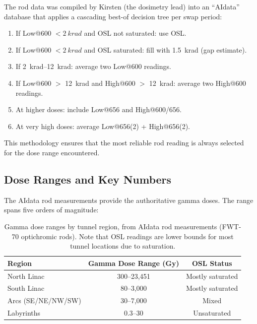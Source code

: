 \documentclass[11pt,letterpaper]{article}
\begin{document}
\begin{description}[style=nextline]
    The rod data was compiled by Kirsten (the dosimetry lead) into an ``AIdata''
    database that applies a cascading best-of decision tree per swap period:
    \begin{enumerate}
        \item If Low@600 $< \SI{2}{krad}$ and OSL not saturated: use OSL.
        \item If Low@600 $< \SI{2}{krad}$ and OSL saturated: fill with
        \SI{1.5}{krad} (gap estimate).
        \item If \SIrange{2}{12}{krad}: average two Low@600 readings.
        \item If Low@600 $>$ \SI{12}{krad} and High@600 $>$ \SI{12}{krad}:
        average two High@600 readings.
        \item At higher doses: include Low@656 and High@600/656.
        \item At very high doses: average Low@656(2) + High@656(2).
    \end{enumerate}
    This methodology ensures that the most reliable rod reading is always
    selected for the dose range encountered.

\end{description}

\subsection{Dose Ranges and Key Numbers}

The AIdata rod measurements provide the authoritative gamma doses. The range
spans five orders of magnitude:

\begin{table}[H]
\centering
\caption{Gamma dose ranges by tunnel region, from AIdata rod measurements
(FWT-70 optichromic rods). Note that OSL readings are lower bounds for most
tunnel locations due to saturation.}
\label{tab:dose_ranges}
\begin{tabular}{@{}lcc@{}}
\toprule
\textbf{Region} & \textbf{Gamma Dose Range (Gy)} & \textbf{OSL Status} \\
\midrule
North Linac    & 300--23,451 & Mostly saturated \\
South Linac    & 80--3,000   & Mostly saturated \\
Arcs (SE/NE/NW/SW) & 30--7,000 & Mixed \\
Labyrinths     & 0.3--30     & Unsaturated \\
\bottomrule
\end{tabular}
\end{table}
\end{document}
